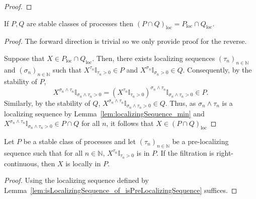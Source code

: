 \begin{proof}\leanok

\end{proof}


\begin{lemma}\label{lem:locally_inter}
  \mathlibok
If $P, Q$ are stable classes of processes then $(P\cap Q)_{\mathrm{loc}} = P_{\mathrm{loc}}\cap Q_{\mathrm{loc}}$.
\end{lemma}

\begin{proof}\leanok
The forward direction is trivial so we only provide proof for the reverse.

Suppose that $X \in P_{\mathrm{loc}}\cap Q_{\mathrm{loc}}$. Then, there exists localizing sequences $(\tau_n)_{n \in \mathbb{N}}$ and $(\sigma_n)_{n \in \mathbb{N}}$ such that $X^{\tau_n} \mathbb{I}_{\tau_n > 0}\in P$ and $X^{\sigma_n} \mathbb{I}_{\sigma_n > 0} \in Q$. Consequently, by the stability of $P$,
\[X^{\sigma_n \wedge \tau_n} \mathbb{I}_{\sigma_n \wedge \tau_n > 0} = (X^{\tau_n} \mathbb{I}_{\tau_n > 0})^{\sigma_n \wedge \tau_n} \mathbb{I}_{\sigma_n \wedge \tau_n > 0} \in P.\]
Similarly, by the stability of $Q$, $X^{\sigma_n \wedge \tau_n} \mathbb{I}_{\sigma_n \wedge \tau_n > 0} \in Q$. Thus, as $\sigma_n \wedge \tau_n$ is a localizing sequence by Lemma~\ref{lem:localizingSequence_min} and $X^{\sigma_n \wedge \tau_n} \mathbb{I}_{\sigma_n \wedge \tau_n > 0} \in P \cap Q$ for all $n$, it follows that $X \in (P \cap Q)_{\mathrm{loc}}$
\end{proof}


\begin{lemma}\label{lem:locally_of_isPreLocalizingSequence}
  \mathlibok
Let $P$ be a stable class of processes and let $(\tau_n)_{n \in \mathbb{N}}$ be a pre-localizing sequence such that for all $n \in \mathbb{N}$, $X^{\tau_n}\mathbb{I}_{\tau_n > 0}$ is in $P$.
If the filtration is right-continuous, then $X$ is locally in $P$.
\end{lemma}

\begin{proof}\leanok
  Using the localizing sequence defined by Lemma~\ref{lem:isLocalizingSequence_of_isPreLocalizingSequence} suffices.
\end{proof}


